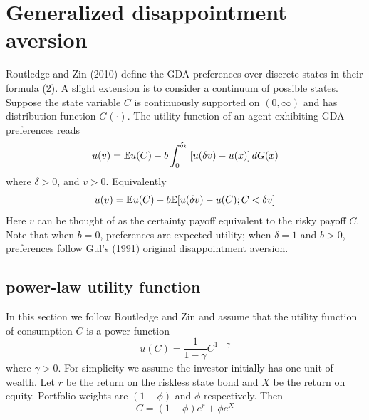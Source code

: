 \documentclass{article}
\begin{document}


\section{Generalized disappointment aversion}
\label{sec:GDA}
Routledge and Zin (2010) \cite{routledge2010generalized} define the GDA
preferences over discrete states in their formula (2). A slight extension
is to consider a continuum of possible states. Suppose the state variable
$C$ is continuously supported on $(0, \infty)$ and has distribution
function $G(\cdot)$. The utility function of an agent exhibiting GDA
preferences reads
\begin{equation}
  u(v)= \E u(C) - b \int_{0}^{\delta v}
  \left[ u(\delta v) - u(x) \right] dG(x)\label{11}%
\end{equation}
where $\delta > 0$, and $v>0$. Equivalently
\begin{equation}
  \label{eq:xxie0}
  u(v) = \mathbb{E} u(C) - b \mathbb{E}[u(\delta v) - u(C); C < \delta v]
\end{equation}
Here $v$ can be thought of as the certainty payoff equivalent to the
risky payoff $C$. Note that when $b=0$, 
preferences are expected utility; when $\delta=1$ and $b>0$,
preferences follow Gul's (1991) original disappointment aversion.

\subsection{power-law utility function}
In this section we follow Routledge and Zin \cite{routledge2010generalized} and assume
that the utility function of consumption $C$ is a power function%
\begin{equation}
  \label{eq:power_utility}
  u(C)=\frac{1}{1-\gamma}C^{1-\gamma}%
\end{equation}
where $\gamma > 0$. For simplicity we assume the investor
initially has one unit of wealth. Let $r$ be the return on the
riskless state bond and $X$ be the return on equity. Portfolio weights
are $\left(1-\phi\right)$ and $\phi$ respectively. Then
\begin{equation*}
  C = (1 - \phi) e^r + \phi e^X
\end{equation*}
\end{document}
